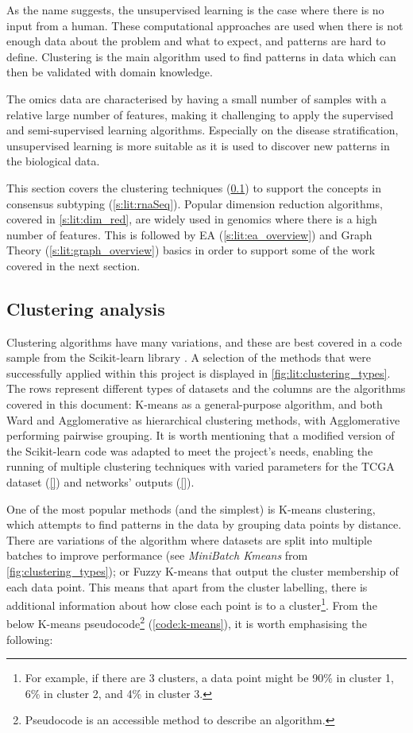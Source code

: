 As the name suggests, the unsupervised learning is the case where there is no input from a human. These computational approaches are used when there is not enough data about the problem and what to expect, and patterns are hard to define. Clustering is the main algorithm used to find patterns in data which can then be validated with domain knowledge. 

The omics data are characterised by having a small number of samples with a relative large number of features, making it challenging to apply the supervised and semi-supervised learning algorithms. Especially on the disease stratification, unsupervised learning is more suitable as it is used to discover new patterns in the biological data.

This section covers the clustering techniques (\ref{s:lit:clustering}) to support the concepts in consensus subtyping (\ref{s:lit:rnaSeq}). Popular dimension reduction algorithms, covered in \cref{s:lit:dim_red}, are widely used in genomics where there is a high number of features. This is followed by EA (\ref{s:lit:ea_overview}) and Graph Theory (\ref{s:lit:graph_overview}) basics in order to support some of the work covered in the next section.

\subsection{Clustering analysis} \label{s:lit:clustering}

Clustering algorithms have many variations, and these are best covered in a code sample \cite{Scikit-learn_undated-ax} from the Scikit-learn library \cite{Pedregosa2011-ts}. A selection of the methods that were successfully applied within this project is displayed in \cref{fig:lit:clustering_types}. The rows represent different types of datasets and the columns are the algorithms covered in this document: K-means as a general-purpose algorithm, and both Ward and Agglomerative as hierarchical clustering methods, with Agglomerative performing pairwise grouping. It is worth mentioning that a modified version of the Scikit-learn code was adapted to meet the project's needs, enabling the running of multiple clustering techniques with varied parameters for the TCGA dataset (\ref{}) and networks' outputs (\ref{}).

One of the most popular methods (and the simplest) is K-means clustering, which attempts to find patterns in the data by grouping data points by distance. There are variations of the algorithm where datasets are split into multiple batches to improve performance (see \textit{MiniBatch Kmeans} from \cref{fig:clustering_types}); or Fuzzy K-means that output the cluster membership of each data point. This means that apart from the cluster labelling, there is additional information about how close each point is to a cluster\footnote{For example, if there are 3 clusters, a data point might be 90\% in cluster 1, 6\% in cluster 2, and 4\% in cluster 3.}. From the below K-means pseudocode\footnote{Pseudocode is an accessible method to describe an algorithm.} (\cref{code:k-means}), it is worth emphasising the following:


